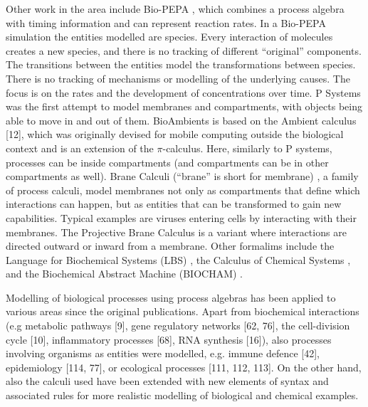 Other work in the area include Bio-PEPA \cite{CiocchettaBiopepa}, which combines a process algebra with timing information and can represent reaction rates. In a Bio-PEPA simulation the entities modelled are species. Every interaction of molecules creates a new species, and there is no tracking of different “original” components. The transitions between the entities model the transformations between species. There is no tracking of mechanisms or modelling of the underlying causes. The focus is on the rates and the development of concentrations over time. P Systems \cite{psystems} was the first attempt to model membranes and compartments, with objects being able to move in and out of them. BioAmbients \cite{RegevBioambients} is based on the Ambient calculus [12], which was originally devised for mobile computing outside the biological context and is an extension of the $\pi$-calculus. Here, similarly to P systems, processes can be inside compartments (and compartments can be in other compartments as well). Brane Calculi (“brane” is short for membrane) \cite{CardelliMobileAmbients}, a family of process calculi, model membranes not only as compartments that define which interactions can happen, but as entities that can be transformed to gain new capabilities. Typical examples are viruses entering cells by interacting with their membranes. The Projective Brane Calculus \cite{ProjectiveBrane} is a variant where interactions are directed outward or inward from a membrane. Other formalims include the Language for Biochemical Systems (LBS) \cite{PlotkinLBS}, the Calculus of Chemical Systems \cite{PlotkinCCS}, and the Biochemical Abstract Machine (BIOCHAM) \cite{biocham}.

Modelling of biological processes using process algebras has been applied to various areas since the original publications. Apart from biochemical interactions (e.g
metabolic pathways [9], gene regulatory networks [62, 76], the cell-division cycle [10], inflammatory processes [68], RNA synthesis [16]), also processes involving organisms as entities were modelled, e.g. immune defence [42], epidemiology [114, 77], or ecological processes [111, 112, 113]. On the other hand, also the calculi used have been extended with new elements of syntax and associated rules for more realistic modelling of biological and chemical examples.